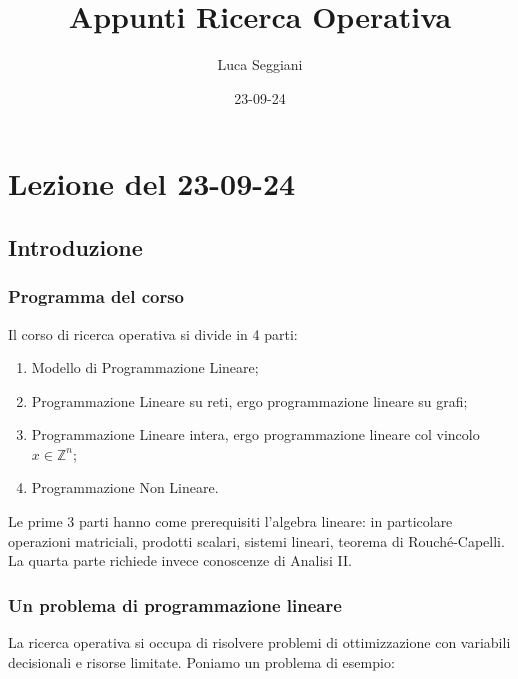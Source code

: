 \documentclass[a4paper,11pt]{article}
\title{Appunti Ricerca Operativa}
\author{Luca Seggiani}
\date{23-09-24}
\begin{document}
\section{Lezione del 23-09-24}

\thispagestyle{empty}
\pagestyle{fancy}

\subsection{Introduzione}

\subsubsection{Programma del corso}
Il corso di ricerca operativa si divide in 4 parti:

\begin{enumerate}
	\item Modello di Programmazione Lineare;
	\item Programmazione Lineare su reti, ergo programmazione lineare su grafi;
	\item Programmazione Lineare intera, ergo programmazione lineare col vincolo $x \in \mathbb{Z}^n$;
	\item Programmazione Non Lineare.
\end{enumerate}

Le prime 3 parti hanno come prerequisiti l'algebra lineare: in particolare operazioni matriciali, prodotti scalari, sistemi lineari, teorema di Rouché-Capelli.
La quarta parte richiede invece conoscenze di Analisi II.

\subsubsection{Un problema di programmazione lineare}

La ricerca operativa si occupa di risolvere problemi di ottimizzazione con variabili decisionali e risorse limitate.
Poniamo un problema di esempio:
\end{document}
